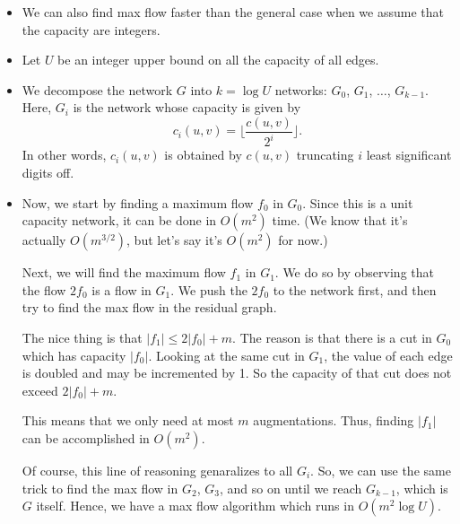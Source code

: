 \documentclass[10pt]{article}
\begin{document}
    \begin{itemize}
      \item We can also find max flow faster than the
        general case when we assume that the capacity
        are integers. 
        
      \item Let $U$ be an integer upper
        bound on all the capacity of all edges.
        
      \item We decompose the network
        $G$ into $k = \log U$ networks: $G_0$,
        $G_1$, $\dotsc$, $G_{k-1}$. Here, $G_i$
        is the network whose capacity is given by
        $$c_i(u,v) = \Big\lfloor \frac{c(u,v)}{2^i} \Big\rfloor.$$
        In other words, $c_i(u,v)$ is obtained by $c(u,v)$
        truncating $i$ least significant digits off.
        
      \item Now, we start by finding a maximum flow $f_0$
        in $G_0$. Since this is a unit capacity network,
        it can be done in $O(m^2)$ time. (We know that
        it's actually $O(m^{3/2})$, but let's say 
        it's $O(m^2)$ for now.)
        
        Next, we will find the maximum flow $f_1$ in $G_1$.
        We do so by observing that the flow $2f_0$ is
        a flow in $G_1$. We push the $2f_0$ to the network
        first, and then try to find the max flow in the
        residual graph.
        
        The nice thing is that $|f_1| \leq 2|f_0| + m$.
        The reason is that there is a cut in $G_0$
        which has capacity $|f_0|$. Looking at the same
        cut in $G_1$, the value of each edge is doubled
        and may be incremented by 1. So the capacity
        of that cut does not exceed $2|f_0| + m.$
        
        This means that we only need at most $m$ augmentations.
        Thus, finding $|f_1|$ can be accomplished in $O(m^2).$
        
        Of course, this line of reasoning genaralizes to all $G_i$.
        So, we can use the same trick to find the max flow in $G_2$, $G_3$, 
        and so on until we reach $G_{k-1}$, which is $G$ itself. 
        Hence, we have a max flow algorithm which runs in $O(m^2 \log U).$
        
    \end{itemize}
\end{document}
